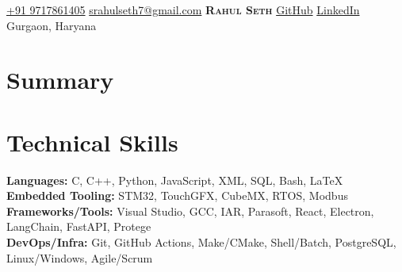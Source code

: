 \documentclass{../templates/simplecv}
\begin{document}
\begin{center}
    \small
    \faMobile\hspace{.5pt} \href{tel:919717861405}{+91 9717861405} \quad
    \faAt\hspace{.5pt} \href{mailto:srahulseth7@gmail.com}{srahulseth7@gmail.com} \quad
    \textbf{\Huge \scshape Rahul Seth} \quad
    \faGithub\hspace{.5pt} \href{https://github.com/sethr07}{GitHub} \quad
    \faLinkedinSquare\hspace{.5pt} \href{https://www.linkedin.com/in/rahuls7}{LinkedIn} \quad
    \faMapMarker \hspace{.5pt} Gurgaon, Haryana
\end{center}

\section{Summary}
\resumeSubHeadingListStart
{}

\resumeSubHeadingListEnd


\section{Technical Skills}
\resumeSubHeadingListStart
\small{\item{
    \textbf{Languages: } C, C++, Python, JavaScript, XML, SQL, Bash, LaTeX \\
    \textbf{Embedded Tooling: } STM32, TouchGFX, CubeMX, RTOS, Modbus \\
    \textbf{Frameworks/Tools: } Visual Studio, GCC, IAR, Parasoft, React, Electron, LangChain, FastAPI, Protege \\
    \textbf{DevOps/Infra: } Git, GitHub Actions, Make/CMake, Shell/Batch, PostgreSQL, Linux/Windows, Agile/Scrum \\
}}
\resumeSubHeadingListEnd
\end{document}
